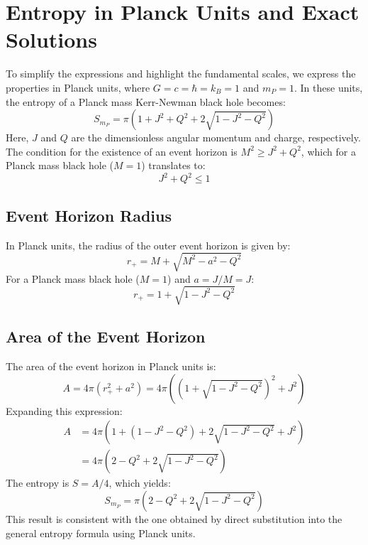 \documentclass{article}
\begin{document}
	\section{Entropy in Planck Units and Exact Solutions}
	
	To simplify the expressions and highlight the fundamental scales, we express the properties in Planck units, where $G = c = \hbar = k_B = 1$ and $m_P = 1$. In these units, the entropy of a Planck mass Kerr-Newman black hole becomes:
	$$S_{m_P} = \pi \left( 1 + J^2 + Q^2 + 2 \sqrt{1 - J^2 - Q^2} \right)$$
	Here, $J$ and $Q$ are the dimensionless angular momentum and charge, respectively. The condition for the existence of an event horizon is $M^2 \ge J^2 + Q^2$, which for a Planck mass black hole ($M=1$) translates to:
	\begin{equation}
		J^2 + Q^2 \le 1
		\label{eq:horizon_condition}
	\end{equation}
	
	\subsection{Event Horizon Radius}
	
	In Planck units, the radius of the outer event horizon is given by:
	$$r_+ = M + \sqrt{M^2 - a^2 - Q^2}$$
	For a Planck mass black hole ($M=1$) and $a = J/M = J$:
	\begin{equation}
		r_+ = 1 + \sqrt{1 - J^2 - Q^2}
		\label{eq:horizon_radius}
	\end{equation}
	
	\subsection{Area of the Event Horizon}
	
	The area of the event horizon in Planck units is:
	$$A = 4 \pi (r_+^2 + a^2) = 4 \pi \left( (1 + \sqrt{1 - J^2 - Q^2})^2 + J^2 \right)$$
	Expanding this expression:
	\begin{align*}
		A &= 4 \pi \left( 1 + (1 - J^2 - Q^2) + 2 \sqrt{1 - J^2 - Q^2} + J^2 \right) \\
		&= 4 \pi \left( 2 - Q^2 + 2 \sqrt{1 - J^2 - Q^2} \right)
	\end{align*}
	The entropy is $S = A / 4$, which yields:
	\begin{equation}
		S_{m_P} = \pi \left( 2 - Q^2 + 2 \sqrt{1 - J^2 - Q^2} \right)
		\label{eq:entropy_planck_units}
	\end{equation}
	This result is consistent with the one obtained by direct substitution into the general entropy formula using Planck units.
	
\end{document}
